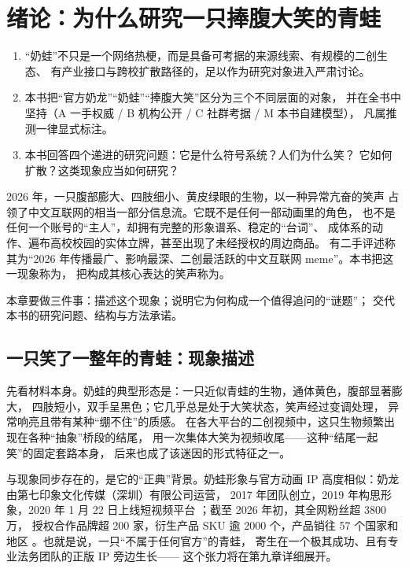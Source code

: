 \chapter{绪论：为什么研究一只捧腹大笑的青蛙}\label{ch:01}

\begin{nlkeypoints}
  \begin{enumerate}[label=(\arabic*),leftmargin=2.4em]
    \item “奶蛙”不只是一个网络热梗，而是具备可考据的来源线索、有规模的二创生态、
          有产业接口与跨校扩散路径的，足以作为研究对象进入严肃讨论。
    \item 本书把“官方奶龙”“奶蛙”“捧腹大笑”区分为三个不同层面的对象，
          并在全书中坚持（A 一手权威 / B 机构公开 / C 社群考据 / M 本书自建模型），
          凡属推测一律显式标注。
    \item 本书回答四个递进的研究问题：它是什么符号系统？人们为什么笑？
          它如何扩散？这类现象应当如何研究？
  \end{enumerate}
\end{nlkeypoints}

2026 年，一只腹部膨大、四肢细小、黄皮绿眼的生物，以一种异常亢奋的笑声
占领了中文互联网的相当一部分信息流。它既不是任何一部动画里的角色，
也不是任何一个账号的“主人”，却拥有完整的形象谱系、稳定的“台词”、
成体系的动作、遍布高校校园的实体立牌，甚至出现了未经授权的周边商品。
有二手评述称其为“2026 年传播最广、影响最深、二创最活跃的中文互联网
meme”\cite{shoutanji2026naiwa}。本书把这一现象称为，
把构成其核心表达的笑声称为。

本章要做三件事：描述这个现象；说明它为何构成一个值得追问的“谜题”；
交代本书的研究问题、结构与方法承诺。

\section{一只笑了一整年的青蛙：现象描述}\label{sec:01:phenomenon}

先看材料本身。奶蛙的典型形态是：一只近似青蛙的生物，通体黄色，腹部显著膨大，
四肢短小，双手呈黑色；它几乎总是处于大笑状态，笑声经过变调处理，
异常响亮且带有某种“绷不住”的质感\cite{shoutanji2026naiwa}。
在各大平台的二创视频中，这只生物频繁出现在各种“抽象”桥段的结尾，
用一次集体大笑为视频收尾——这种“结尾一起笑”的固定套路本身，
后来也成了该迷因的形式特征之一\cite{shoutanji2026naiwa}。

与现象同步存在的，是它的“正典”背景。奶蛙形象与官方动画 IP
高度相似：奶龙由第七印象文化传媒（深圳）有限公司运营，
2017 年团队创立，2019 年构思形象，2020 年 1 月 22 日上线短视频平台
\cite{jiang2026nailong}；截至 2026 年初，其全网粉丝超 3800 万，
授权合作品牌超 200 家，衍生产品 SKU 逾 2000 个，产品销往 57 个国家和地区
\cite{jiang2026nailong}。也就是说，一只“不属于任何官方”的青蛙，
寄生在一个极其成功、且有专业法务团队的正版 IP 旁边生长——
这个张力将在第九章详细展开。

